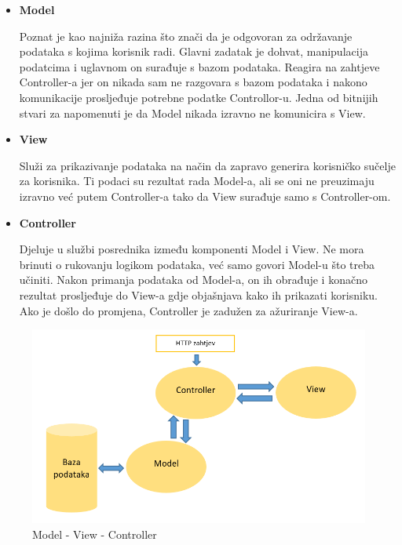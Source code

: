 		\vspace{5mm} %

		\begin{itemize}
		\item \textbf{Model}	
		
		Poznat je kao najniža razina što znači da je odgovoran za održavanje podataka s kojima korisnik radi. Glavni zadatak je dohvat, manipulacija podatcima i uglavnom on surađuje s bazom podataka. Reagira na zahtjeve Controller-a jer on nikada sam ne razgovara s bazom podataka i nakono komunikacije prosljeđuje potrebne podatke Controllor-u. Jedna od bitnijih stvari za napomenuti je da Model nikada izravno ne komunicira s View.

		\item \textbf{View}
		
		Služi za prikazivanje podataka na način da zapravo generira korisničko sučelje za korisnika. Ti podaci su rezultat rada Model-a, ali se oni ne preuzimaju izravno već putem Controller-a tako da View surađuje samo s Controller-om. 

		\item \textbf{Controller}

		Djeluje u službi posrednika između komponenti Model i View. Ne mora brinuti o rukovanju logikom podataka, već samo govori Model-u što treba učiniti. Nakon primanja podataka od Model-a, on ih obrađuje i konačno rezultat prosljeđuje do View-a gdje objašnjava kako ih prikazati korisniku. Ako je došlo do promjena, Controller je zadužen za ažuriranje View-a.


		\end{itemize}


		\begin{figure}[H]
					\includegraphics[scale=0.8]{arhitektura/mvc.png} %
					\centering
					\caption{Model - View - Controller}
					\label{fig:arhitektura}
		\end{figure}

